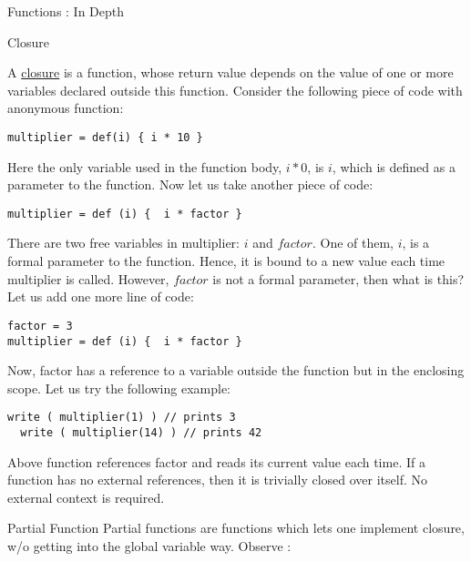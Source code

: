 \begin{section}{Functions : In Depth}
\begin{subsection}{Closure}

A \href{https://en.wikipedia.org/wiki/Closure_(computer_programming)}{closure} 
is a function, whose return value depends on the value of one or more variables declared outside this function. 
Consider the following piece of code with anonymous function:

\begin{lstlisting}[style=JexlStyle]
multiplier = def(i) { i * 10 }
\end{lstlisting}

Here the only variable used in the function body, $i * 0$, is $i$, which is defined as a parameter to the function. 
Now let us take another piece of code:

\begin{lstlisting}[style=JexlStyle]
multiplier = def (i) {  i * factor } 
\end{lstlisting}

There are two free variables in multiplier: $i$ and $factor$. One of them, $i$, is a formal parameter to the function. 
Hence, it is bound to a new value each time multiplier is called. 
However, $factor$ is not a formal parameter, then what is this? 
Let us add one more line of code:

\begin{lstlisting}[style=JexlStyle]
factor = 3
multiplier = def (i) {  i * factor } 
\end{lstlisting}

Now, factor has a reference to a variable outside the function but in the enclosing scope. Let us try the following example:

\begin{lstlisting}[style=JexlStyle]
  write ( multiplier(1) ) // prints 3 
  write ( multiplier(14) ) // prints 42 
\end{lstlisting}
  
Above function references factor and reads its current value each time. 
If a function has no external references, then it is trivially closed over itself. No external context is required.

\end{subsection}

\begin{subsection}{Partial Function}
Partial functions are functions which lets one implement closure, w/o 
getting into the global variable way. Observe :


\end{subsection}
\end{section}
